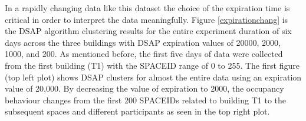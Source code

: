 
In a rapidly changing data like this dataset the choice of the expiration time is critical in order to interpret the data meaningfully. Figure \ref{expirationchang} is the DSAP algorithm clustering results for the entire experiment duration of six days across the three buildings with DSAP expiration values of 20000, 2000, 1000, and 200. As mentioned before, the first five days of data were collected from the first building (T1) with the SPACEID range of 0 to 255. The first figure (top left plot) shows DSAP clusters for almost the entire data using an expiration value of 20,000. By decreasing the value of expiration to 2000, the occupancy behaviour changes from the first 200 SPACEIDs related to building T1 to the subsequent spaces and different participants as seen in the top right plot.

